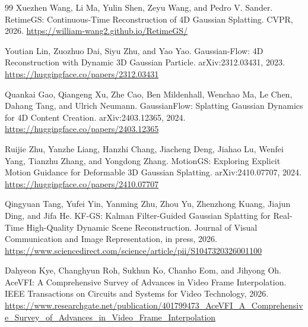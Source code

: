 \documentclass[11pt]{article}
\begin{document}
\begin{thebibliography}{99}
Xuezhen Wang, Li Ma, Yulin Shen, Zeyu Wang, and Pedro V. Sander.
\newblock RetimeGS: Continuous-Time Reconstruction of 4D Gaussian Splatting.
\newblock CVPR, 2026.
\newblock \url{https://william-wang2.github.io/RetimeGS/}

Youtian Lin, Zuozhuo Dai, Siyu Zhu, and Yao Yao.
\newblock Gaussian-Flow: 4D Reconstruction with Dynamic 3D Gaussian Particle.
\newblock arXiv:2312.03431, 2023.
\newblock \url{https://huggingface.co/papers/2312.03431}

Quankai Gao, Qiangeng Xu, Zhe Cao, Ben Mildenhall, Wenchao Ma, Le Chen,
Dahang Tang, and Ulrich Neumann.
\newblock GaussianFlow: Splatting Gaussian Dynamics for 4D Content Creation.
\newblock arXiv:2403.12365, 2024.
\newblock \url{https://huggingface.co/papers/2403.12365}

Ruijie Zhu, Yanzhe Liang, Hanzhi Chang, Jiacheng Deng, Jiahao Lu,
Wenfei Yang, Tianzhu Zhang, and Yongdong Zhang.
\newblock MotionGS: Exploring Explicit Motion Guidance for Deformable 3D
Gaussian Splatting.
\newblock arXiv:2410.07707, 2024.
\newblock \url{https://huggingface.co/papers/2410.07707}

Qingyuan Tang, Yufei Yin, Yanming Zhu, Zhou Yu, Zhenzhong Kuang,
Jiajun Ding, and Jifa He.
\newblock KF-GS: Kalman Filter-Guided Gaussian Splatting for Real-Time
High-Quality Dynamic Scene Reconstruction.
\newblock Journal of Visual Communication and Image Representation, in press,
2026.
\newblock \url{https://www.sciencedirect.com/science/article/pii/S1047320326001100}

Dahyeon Kye, Changhyun Roh, Sukhun Ko, Chanho Eom, and Jihyong Oh.
\newblock AceVFI: A Comprehensive Survey of Advances in Video Frame
Interpolation.
\newblock IEEE Transactions on Circuits and Systems for Video Technology,
2026.
\newblock \url{https://www.researchgate.net/publication/401799473_AceVFI_A_Comprehensive_Survey_of_Advances_in_Video_Frame_Interpolation}

\end{thebibliography}
\end{document}
